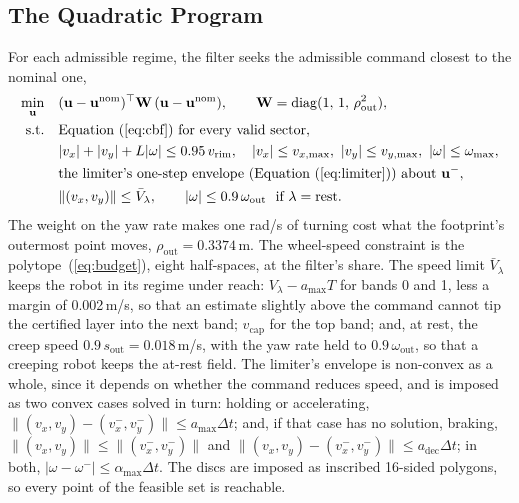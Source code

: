 \documentclass[sensors,article,submit,moreauthors]{Definitions/mdpi}
\begin{document}
\subsection{The Quadratic Program}\label{sec:qp}

For each admissible regime, the filter seeks the admissible command closest to the nominal one,
\begin{equation}
\begin{aligned}
\min_{\mathbf{u}}\quad & (\mathbf{u} - \mathbf{u}^{\text{nom}})^\top \mathbf{W}\, (\mathbf{u} - \mathbf{u}^{\text{nom}}), \qquad \mathbf{W} = \operatorname{diag}(1,\, 1,\, \rho_{\text{out}}^2),\\
\text{s.t.}\quad & \text{Equation~(\ref{eq:cbf}) for every valid sector},\\
& |v_x| + |v_y| + L|\omega| \le 0.95\, v_{\text{rim}}, \quad |v_x| \le v_{x,\max},\ |v_y| \le v_{y,\max},\ |\omega| \le \omega_{\max},\\
& \text{the limiter's one-step envelope (Equation~(\ref{eq:limiter})) about } \mathbf{u}^{-},\\
& \|(v_x, v_y)\| \le \bar{V}_\lambda, \qquad |\omega| \le 0.9\,\omega_{\text{out}} \ \text{ if } \lambda = \text{rest}.
\end{aligned}
\label{eq:qp}
\end{equation}
The weight on the yaw rate makes one rad/s of turning cost what the footprint's outermost point moves, $\rho_{\text{out}} = 0.3374$\,m. The wheel-speed constraint is the polytope~(\ref{eq:budget}), eight half-spaces, at the filter's share. The speed limit $\bar{V}_\lambda$ keeps the robot in its regime under reach: $V_\lambda - a_{\max}T$ for bands 0 and 1, less a margin of 0.002\,m/s, so that an estimate slightly above the command cannot tip the certified layer into the next band; $v_{\text{cap}}$ for the top band; and, at rest, the creep speed $0.9\,s_{\text{out}} = 0.018$\,m/s, with the yaw rate held to $0.9\,\omega_{\text{out}}$, so that a creeping robot keeps the at-rest field. The limiter's envelope is non-convex as a whole, since it depends on whether the command reduces speed, and is imposed as two convex cases solved in turn: holding or accelerating, $\|(v_x,v_y) - (v^-_x,v^-_y)\| \le a_{\max}\Delta t$; and, if that case has no solution, braking, $\|(v_x,v_y)\| \le \|(v^-_x,v^-_y)\|$ and $\|(v_x,v_y) - (v^-_x,v^-_y)\| \le a_{\text{dec}}\Delta t$; in both, $|\omega - \omega^-| \le \alpha_{\max}\Delta t$. The discs are imposed as inscribed 16-sided polygons, so every point of the feasible set is reachable.
\end{document}
